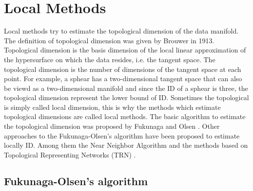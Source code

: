 \documentclass[journal]{IEEEtran}
\begin{document}







\section{Local Methods}
Local methods try to estimate the topological dimension of the
data manifold. The definition of topological dimension was given by Brouwer
\cite{Brouwer75} in 1913. Topological dimension is the basis dimension of the local linear
approximation of the hypersurface on which the data resides, i.e. the tangent
space. The topological dimension is the number of dimensions of the tangent space at each point.
For example, a sphear has a two-dimensional tangent space that can also be viewd as a two-dimensional manifold
 and since the ID of a sphear is three, the topological dimension represent the lower bound of ID. 
Sometimes the topological is simply called local dimension, this is why the methods which estimate topological dimensions are 
called local methods. 
The basic algorithm to estimate the topological 
dimension was proposed by Fukunaga and Olsen \cite{Fukunaga76}. Other approaches 
to the Fukunaga-Olsen’s algorithm have been proposed to estimate locally 
ID. Among them the Near Neighbor Algorithm \cite{Pettis79} and the methods based on 
Topological Representing Networks (TRN) \cite{Martinetz94}.

\subsection{Fukunaga-Olsen’s algorithm}
\end{document}
